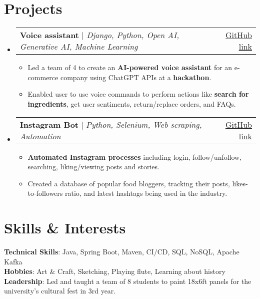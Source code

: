 \documentclass[letterpaper,11pt]{article}
\makeatletter
\newcommand{\resumeItem}[1]{
  \item\small{
    {#1 \vspace{-2pt}}
  }
}
\newcommand{\resumeProjectHeading}[2]{
    \item
    \begin{tabular*}{0.97\textwidth}{l@{\extracolsep{\fill}}r}
      \small#1 & #2 \\
    \end{tabular*}\vspace{-7pt}
}
\newcommand{\resumeSubHeadingListStart}{\begin{itemize}[leftmargin=0.15in, label={}]}
\newcommand{\resumeSubHeadingListEnd}{\end{itemize}}
\newcommand{\resumeItemListStart}{\begin{itemize}}
\newcommand{\resumeItemListEnd}{\end{itemize}\vspace{-5pt}}
\makeatother
\begin{document}
\section{Projects}
    \resumeSubHeadingListStart
      
      \resumeProjectHeading
          {\textbf{Voice assistant} $|$ \emph{Django, Python, Open AI, Generative AI, Machine Learning}}{\small{\href{https://github.com/rubal2508/Ctrl-Alt-Elite}{\underline{GitHub link}}}}
          \resumeItemListStart
            \resumeItem{Led a team of 4 to create an \textbf{AI-powered voice assistant} for an e-commerce company using ChatGPT APIs at a \textbf{hackathon}.}
            \resumeItem{Enabled user to use voice commands to perform actions like \textbf{search for ingredients}, get user sentiments, return/replace orders, and FAQs.}
            
          \resumeItemListEnd

      \resumeProjectHeading
          {\textbf{Instagram Bot} $|$ \emph{Python, Selenium, Web scraping, Automation}}{\small{\href{https://github.com/rubal2508/Project-InstaBot}{\underline{GitHub link}}}}
          \resumeItemListStart
            \resumeItem{\textbf{Automated Instagram processes} including login, follow/unfollow, searching, liking/viewing posts and stories.}
            \resumeItem{Created a database of popular food bloggers, tracking their posts, likes-to-followers ratio, and latest hashtags being used in the industry.}
          \resumeItemListEnd
          
    \resumeSubHeadingListEnd


\section{Skills \& Interests}
 \begin{itemize}[leftmargin=0.15in, label={}]
    \small{\item{
     \textbf{Technical Skills}{: Java, Spring Boot, Maven, CI/CD, SQL, NoSQL, Apache Kafka} \\
     \textbf{Hobbies}{: Art \& Craft, Sketching, Playing flute, Learning about history} \\
     \textbf{Leadership}{: Led and taught a team of 8 students to paint 18x6ft panels for the university's cultural fest in 3rd year.} 
    }}
 \end{itemize}



\end{document}

